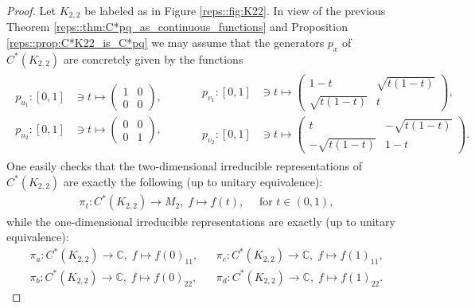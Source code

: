\documentclass[a4paper]{amsart}
\newcommand{\C}{\mathbb{C}}
\begin{document}
\begin{proof}
    Let $K_{2,2}$ be labeled as in Figure \ref{reps::fig:K22}. In view of the previous Theorem \ref{reps::thm:C*pq_as_continuous_functions} and Proposition \ref{reps::prop:C*K22_is_C*pq} we may assume that the generators $p_x$ of $C^\ast(K_{2,2})$ are concretely given by the functions
    \begin{align*}
        \begin{aligned}
            p_{u_1}: [0,1] &\ni t \mapsto \begin{pmatrix}
                1 & 0 \\ 0 & 0
            \end{pmatrix}, \\
            p_{u_2}: [0,1] &\ni t \mapsto \begin{pmatrix}
                0 & 0 \\ 0 & 1
            \end{pmatrix},
        \end{aligned}
        & \qquad 
        \begin{aligned}
            p_{v_1}: [0,1] &\ni t \mapsto \begin{pmatrix}
                1-t & \sqrt{t(1-t)} \\ \sqrt{t(1-t)} & t
            \end{pmatrix}, \\
            p_{v_2}: [0,1] &\ni t \mapsto \begin{pmatrix}
                t & -\sqrt{t(1-t)} \\ -\sqrt{t(1-t)} & 1- t
            \end{pmatrix}.
        \end{aligned}
    \end{align*}
    One easily checks that the two-dimensional irreducible representations of $C^\ast(K_{2,2})$ are exactly the following (up to unitary equivalence):
    \begin{align*}
        \pi_t: C^\ast(K_{2,2}) \to M_2, \; f \mapsto f(t), \quad \text{ for } t \in (0,1),
    \end{align*}
    while the one-dimensional irreducible representations are exactly (up to unitary equivalence):
    \begin{align*}
        \pi_a: C^\ast(K_{2,2}) \to \C, \; f \mapsto f(0)_{11},
        & &\pi_c: C^\ast(K_{2,2}) \to \C, \; f \mapsto f(1)_{11}, \\
        \pi_b: C^\ast(K_{2,2}) \to \C, \; f \mapsto f(0)_{22},
        & &\pi_d: C^\ast(K_{2,2}) \to \C, \; f \mapsto f(1)_{22}.

\end{align*}
\end{proof}
\end{document}
